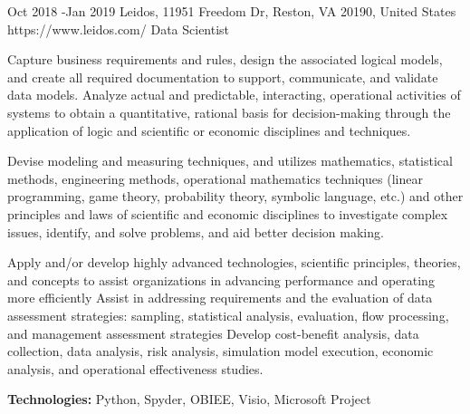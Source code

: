 \documentclass[10pt]{article} %
\begin{document}
\job
{Oct 2018 -}{Jan 2019}
{Leidos, 11951 Freedom Dr, Reston, VA 20190, United States}
{https://www.leidos.com/}
{Data Scientist}
{Capture business requirements and rules, design the associated logical models, and create all required documentation to support, communicate, and validate data models. Analyze actual and predictable, interacting, operational activities of systems to obtain a quantitative, rational basis for decision-making through the application of logic and scientific or economic disciplines and techniques. 

Devise modeling and measuring techniques, and utilizes mathematics, statistical methods, engineering methods, operational mathematics techniques (linear programming, game theory, probability theory, symbolic language, etc.) and other principles and laws of scientific and economic disciplines to investigate complex issues, identify, and solve problems, and aid better decision making.

Apply and/or develop highly advanced technologies, scientific principles, theories, and concepts to assist organizations in advancing performance and operating more efficiently Assist in addressing requirements and the evaluation of data assessment strategies: sampling, statistical analysis, evaluation, flow processing, and management assessment strategies Develop cost-benefit analysis, data collection, data analysis, risk analysis, simulation model execution, economic analysis, and operational effectiveness studies. \\
\rule{0mm}{5mm}\textbf{Technologies:} Python, Spyder, OBIEE, Visio, Microsoft Project}

\pagebreak
\end{document}

